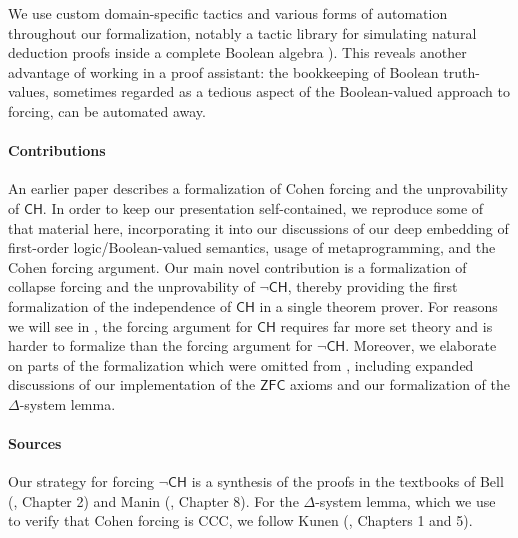 \documentclass[sigplan,screen]{acmart}
\newcommand{\ZFC}{\mathsf{ZFC}}
\newcommand{\CH}{\mathsf{CH}}
\theoremstyle{definition}
\begin{document}
We use custom domain-specific tactics and various forms of automation throughout our formalization, notably a tactic library for simulating natural deduction proofs inside a complete Boolean algebra ).
This reveals another advantage of working in a proof assistant: the bookkeeping of Boolean truth-values, sometimes regarded as a tedious aspect of the Boolean-valued approach to forcing, can be automated away.

\paragraph{Contributions}
An earlier paper \cite{DBLP:conf/itp/HanD19} describes a formalization of Cohen forcing and the unprovability of \(\CH\). In order to keep our presentation self-contained, %
we reproduce some of that material here, incorporating it into our discussions of our deep embedding of first-order logic/Boolean-valued semantics, usage of metaprogramming, and the Cohen forcing argument.
Our main novel contribution is a formalization of collapse forcing and the unprovability of \(\neg \CH\), thereby providing the first formalization of the independence of \(\CH\) in a single theorem prover. For reasons we will see in , the forcing argument for \(\CH\) requires far more set theory and is harder to formalize than the forcing argument for \(\neg \CH\). Moreover, we elaborate on parts of the formalization which were omitted from \cite{DBLP:conf/itp/HanD19}, including expanded discussions of our implementation of the \(\ZFC\) axioms and our formalization of the \(\Delta\)-system lemma.

\paragraph{Sources}
Our strategy for forcing \(\neg \CH\) is a synthesis of the proofs in the textbooks of Bell (\cite{bell2011set}, Chapter 2) and Manin (\cite{manin2009course}, Chapter 8).
For the $\Delta$-system lemma, which we use to verify that Cohen forcing is CCC, we follow Kunen (\cite{kunen2014set}, Chapters 1 and 5).
\end{document}
